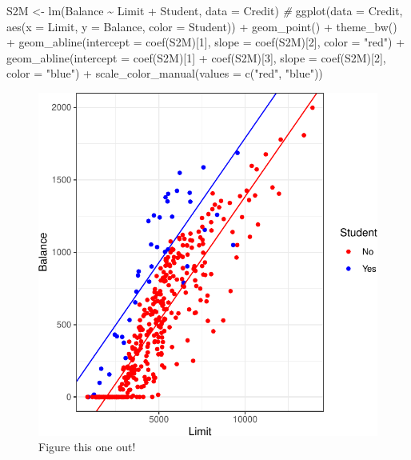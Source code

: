\documentclass[
]{article}
\newenvironment{Shaded}{\begin{snugshade}}{\end{snugshade}}
\newcommand{\AttributeTok}[1]{\textcolor[rgb]{0.77,0.63,0.00}{#1}}
\newcommand{\CommentTok}[1]{\textcolor[rgb]{0.56,0.35,0.01}{\textit{#1}}}
\newcommand{\DecValTok}[1]{\textcolor[rgb]{0.00,0.00,0.81}{#1}}
\newcommand{\FunctionTok}[1]{\textcolor[rgb]{0.00,0.00,0.00}{#1}}
\newcommand{\NormalTok}[1]{#1}
\newcommand{\OtherTok}[1]{\textcolor[rgb]{0.56,0.35,0.01}{#1}}
\newcommand{\SpecialCharTok}[1]{\textcolor[rgb]{0.00,0.00,0.00}{#1}}
\newcommand{\StringTok}[1]{\textcolor[rgb]{0.31,0.60,0.02}{#1}}
\begin{document}
\begin{Shaded}
\begin{Highlighting}[]
\NormalTok{S2M }\OtherTok{\textless{}{-}} \FunctionTok{lm}\NormalTok{(Balance }\SpecialCharTok{\textasciitilde{}}\NormalTok{ Limit }\SpecialCharTok{+}\NormalTok{ Student, }\AttributeTok{data =}\NormalTok{ Credit)}
\CommentTok{\#}
\FunctionTok{ggplot}\NormalTok{(}\AttributeTok{data =}\NormalTok{ Credit, }\FunctionTok{aes}\NormalTok{(}\AttributeTok{x =}\NormalTok{ Limit, }\AttributeTok{y =}\NormalTok{ Balance, }\AttributeTok{color =}\NormalTok{ Student)) }\SpecialCharTok{+}
  \FunctionTok{geom\_point}\NormalTok{() }\SpecialCharTok{+} 
  \FunctionTok{theme\_bw}\NormalTok{() }\SpecialCharTok{+} 
  \FunctionTok{geom\_abline}\NormalTok{(}\AttributeTok{intercept =} \FunctionTok{coef}\NormalTok{(S2M)[}\DecValTok{1}\NormalTok{], }\AttributeTok{slope =} \FunctionTok{coef}\NormalTok{(S2M)[}\DecValTok{2}\NormalTok{], }\AttributeTok{color =} \StringTok{"red"}\NormalTok{) }\SpecialCharTok{+} 
  \FunctionTok{geom\_abline}\NormalTok{(}\AttributeTok{intercept =} \FunctionTok{coef}\NormalTok{(S2M)[}\DecValTok{1}\NormalTok{] }\SpecialCharTok{+} \FunctionTok{coef}\NormalTok{(S2M)[}\DecValTok{3}\NormalTok{], }\AttributeTok{slope =} \FunctionTok{coef}\NormalTok{(S2M)[}\DecValTok{2}\NormalTok{], }\AttributeTok{color =} \StringTok{"blue"}\NormalTok{) }\SpecialCharTok{+} 
  \FunctionTok{scale\_color\_manual}\NormalTok{(}\AttributeTok{values =} \FunctionTok{c}\NormalTok{(}\StringTok{"red"}\NormalTok{, }\StringTok{"blue"}\NormalTok{))}
\end{Highlighting}
\end{Shaded}

\begin{figure}

{\centering \includegraphics{SDM-CHAP24_files/figure-latex/CG-1} 

}

\caption{Figure this one out!}\label{fig:CG}
\end{figure}
\end{document}

